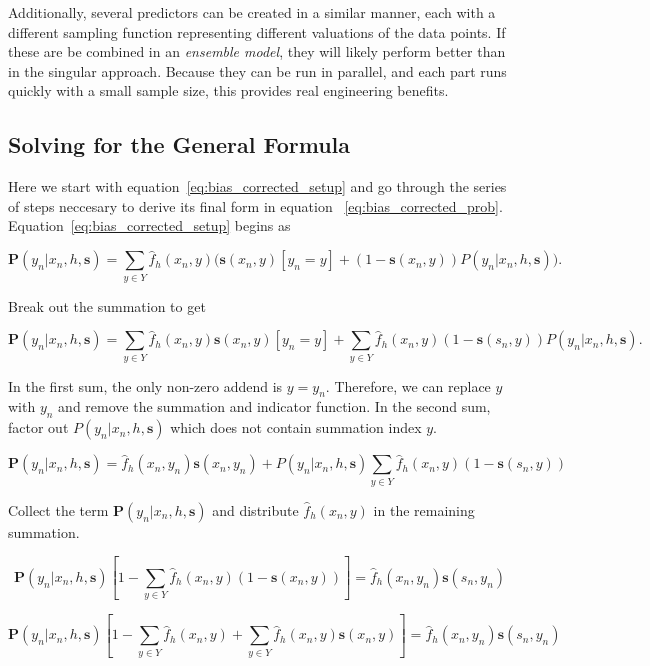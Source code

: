 \documentclass[twoside]{article}
\begin{document}
Additionally, several predictors can be created in a similar manner, each with a different sampling function representing different valuations of the data points. If these are be combined in an \textit{ensemble model}, they will likely perform better than in the singular approach. Because they can be run in parallel, and each part runs quickly with a small sample size, this provides real engineering benefits.

\begin{appendices}

\section{Solving for the General Formula}
\label{appendix:solving}

Here we start with equation~\eqref{eq:bias_corrected_setup} and go through the series of steps neccesary to derive its final form in equation ~\eqref{eq:bias_corrected_prob}. Equation~\eqref{eq:bias_corrected_setup} begins as

\[\mathbf{P}(y_n|x_n,h,\mathbf{s})=\sum_{y \in Y}\hat{f}_h(x_n,y)\big(\mathbf{s}(x_n,y)\left [y_n = y\right ] + (1-\mathbf{s}(x_n,y))P(y_n|x_n,h,\mathbf{s})\big).\]

Break out the summation to get

\[\mathbf{P}(y_n|x_n,h,\mathbf{s})=\sum_{y \in Y}\hat{f}_h(x_n,y)\mathbf{s}(x_n,y)\left [y_n = y\right ] +\sum_{y \in Y}\hat{f}_h(x_n,y)(1-\mathbf{s}(s_n,y))P(y_n|x_n,h,\mathbf{s}).\]

In the first sum, the only non-zero addend is \(y = y_n\). Therefore, we can replace \(y\) with \(y_n\) and remove the summation and indicator function. In the second sum, factor out \(P(y_n|x_n,h,\mathbf{s})\) which does not contain summation index \(y\).

\[\mathbf{P}(y_n|x_n,h,\mathbf{s})=\hat{f}_h(x_n,y_n)\mathbf{s}(x_n,y_n) +P(y_n|x_n,h,\mathbf{s})\sum_{y \in Y}\hat{f}_h(x_n,y)(1-\mathbf{s}(s_n,y))\]

Collect the term \(\mathbf{P}(y_n|x_n,h,\mathbf{s})\) and distribute \(\hat{f}_h(x_n,y)\) in the remaining summation.

\[\mathbf{P}(y_n|x_n,h,\mathbf{s})\left [ 1 - \sum_{y \in Y}\hat{f}_h(x_n,y)(1-\mathbf{s}(x_n,y)) \right ]=\hat{f}_h(x_n,y_n)\mathbf{s}(s_n,y_n) \]

\[\mathbf{P}(y_n|x_n,h,\mathbf{s})\left [ 1 - \sum_{y \in Y}\hat{f}_h(x_n,y)+\sum_{y \in Y}\hat{f}_h(x_n,y)\mathbf{s}(x_n,y) \right ]=\hat{f}_h(x_n,y_n)\mathbf{s}(s_n,y_n) \]


\end{appendices}
\end{document}
